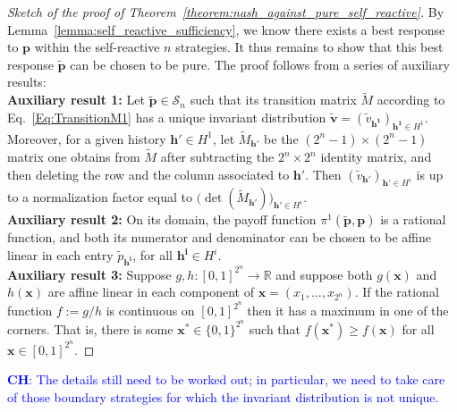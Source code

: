 \documentclass[11pt]{article}
\newcommand{\christian}[1]{\textcolor{blue}{\textbf{CH}: #1}}
\theoremstyle{plainCl1}
\theoremstyle{plainCl2}
\begin{document}
\begin{proof}[Sketch of the proof of Theorem~\ref{theorem:nash_against_pure_self_reactive}]
By Lemma~\ref{lemma:self_reactive_sufficiency}, we know there exists a best response to $\mathbf{p}$ within the self-reactive $n$ strategies. It thus remains to show that this best response $\mathbf{\tilde p}$ can be chosen to be pure. 
The proof follows from a series of auxiliary results:\\[0.5cm]
\noindent
{\bf Auxiliary result 1:}
Let $\mathbf{\tilde p}\!\in\!\mathcal{S}_n$ such that its transition matrix $\tilde M$ according to Eq.~\eqref{Eq:TransitionM1} has a unique invariant distribution $\mathbf{\tilde v} \!=\! (\tilde v_\mathbf{h^1})_{\mathbf{h^1}\in H^1}$. Moreover, for a given history $\mathbf{h'}\!\in\!H^1$, let $\tilde M_\mathbf{h'}$ be the $(2^n\!-\!1)\!\times\!(2^n\!-\!1)$ matrix one obtains from $\tilde M$ after subtracting the $2^n\!\times\!2^n$ identity matrix, and then deleting the row and the column associated to $\mathbf{h'}$. Then $(\tilde{v}_\mathbf{h'})_{\mathbf{h'}\in H^i}$ is up to a normalization factor equal to  $\big(\det(\tilde M_{\mathbf{h'}})\big)_{\mathbf{h'}\in H^i}$.\\[0.5cm]
\noindent
{\bf Auxiliary result 2:}
On its domain, the payoff function $\pi^1(\mathbf{\tilde p},\mathbf{p})$ is a rational function, and both its numerator and denominator can be chosen to be affine linear in each entry $\tilde p_\mathbf{h^i} $, for all $\mathbf{h^i}\!\in\!H^i$.\\[0.5cm]
\noindent
{\bf Auxiliary result 3:} Suppose $g,h:[0,1]^{2^n}\!\rightarrow\! \mathbb{R}$ and suppose both $g(\mathbf{x})$ and $h(\mathbf{x})$ are affine linear in each component of $\mathbf{x}=(x_1,\ldots,x_{2^n})$. If the rational function $f\!:=\!g/h$ is continuous on $[0,1]^{2^n}$ then it has a maximum in one of the corners. That is, there is some $\mathbf{x^*}\!\in\!\{0,1\}^{2^n}$ such that $f(\mathbf{x^*}) \ge f(\mathbf{x})$ for all $\mathbf{x}\!\in\![0,1]^{2^n}$.
\end{proof}

\noindent
\christian{The details still need to be worked out; in particular, we need to take care of those boundary strategies for which the invariant distribution is not unique.}


\end{document}
